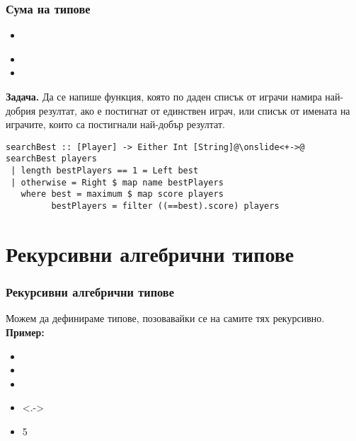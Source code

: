 \documentclass[alsotrans]{beamerswitch}
\begin{document}
\begin{frame}[fragile]
  \frametitle{Сума на типове}
  \begin{itemize}[<+->]
  \item {}\\
      \hspace{5em}
  \item {}
  \item {}
  \end{itemize}
  \onslide<+->
  \textbf{Задача.} Да се напише функция, която по даден списък от играчи намира най-добрия резултат, ако е постигнат от единствен играч, или списък от имената на играчите, които са постигнали най-добър резултат.
  \onslide<+->
\begin{lstlisting}
searchBest :: [Player] -> Either Int [String]@\onslide<+->@
searchBest players
 | length bestPlayers == 1 = Left best
 | otherwise = Right $ map name bestPlayers
   where best = maximum $ map score players
         bestPlayers = filter ((==best).score) players
\end{lstlisting}
\end{frame}

\section{Рекурсивни алгебрични типове}

\begin{frame}[fragile]
  \frametitle{Рекурсивни алгебрични типове}
  Можем да дефинираме типове, позовавайки се на самите тях \alert{рекурсивно}.\\[2ex]
  \pause
  \textbf{Пример:}
  \begin{itemize}[<+->]
  \item {}
  \item {}
  \item {}
  \item<.-> 
  \item {}5
  \end{itemize}
\end{frame}
\end{document}
